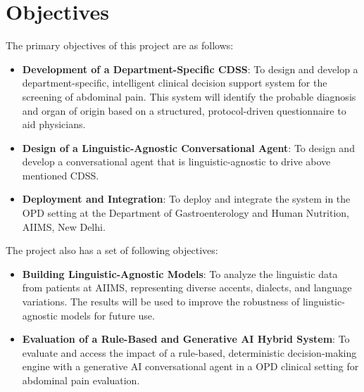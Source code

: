\section{Objectives}
The primary objectives of this project are as follows:
\begin{itemize}
    \item \textcolor{TUMRed}{\textbf{Development of a Department-Specific CDSS}}: To design and develop a \textcolor{TUMBlue}{department-specific}, intelligent \textcolor{TUMBlue}{clinical decision support system} for the screening of \textcolor{TUMBlue}{abdominal pain}.  This system will identify the \textcolor{TUMBlue}{probable diagnosis} and organ of origin based on a structured, protocol-driven questionnaire to aid physicians.
    \item \textcolor{TUMRed}{\textbf{Design of a Linguistic-Agnostic Conversational Agent}}: To design and develop a conversational agent that is linguistic-agnostic to drive above mentioned CDSS.
    \item \textcolor{TUMRed}{\textbf{Deployment and Integration}}: To deploy and integrate the system in the OPD setting at the Department of Gastroenterology and Human Nutrition, AIIMS, New Delhi.
\end{itemize}
The project also has a set of following objectives:
\begin{itemize}
    \item \textcolor{TUMRed}{\textbf{Building Linguistic-Agnostic Models}}: To analyze the linguistic data from patients at AIIMS, representing diverse accents, dialects, and language variations. The results will be used to improve the robustness of linguistic-agnostic models for future use.
    \item \textcolor{TUMRed}{\textbf{Evaluation of a Rule-Based and Generative AI Hybrid System}}: To evaluate and access the impact of a rule-based, deterministic decision-making engine with a generative AI conversational agent in a OPD clinical setting for abdominal pain evaluation.
\end{itemize}